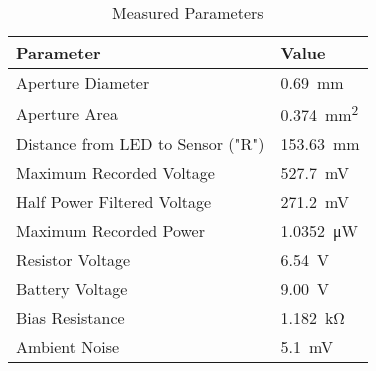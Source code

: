 \begin{table}[!htb]
\caption{Measured Parameters} \label{tab:meas_params}
\bigskip
\centering
\begin{tabular}{l|l}
\rowcolor[HTML]{C0C0C0} 
\textbf{Parameter} & \textbf{Value} \\ \hline
Aperture Diameter & \SI{0.69}{mm} \\
Aperture Area & \SI{0.374}{mm^2} \\
Distance from LED to Sensor ("R") & \SI{153.63}{mm} \\
Maximum Recorded Voltage & \SI{527.7}{mV} \\
Half Power Filtered Voltage & \SI{271.2}{mV} \\
Maximum Recorded Power & \SI{1.0352}{\micro\watt} \\
Resistor Voltage & \SI{6.54}{V} \\
Battery Voltage & \SI{9.00}{V} \\
Bias Resistance & \SI{1.182}{\kilo\ohm} \\
Ambient Noise & \SI{5.1}{\milli\volt}
\end{tabular}
\end{table}


